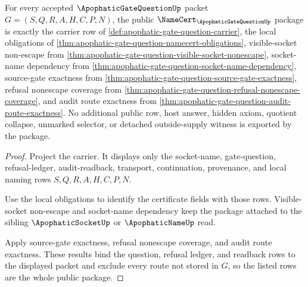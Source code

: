 \begin{theorem}
\label{thm:apophatic-gate-question-public-namecert-package}
For every accepted $\ApophaticGateQuestionUp$ packet $G=(S,Q,R,A,H,C,P,N)$, the public $\NameCert_{\ApophaticGateQuestionUp}$ package is exactly the carrier row of \autoref{def:apophatic-gate-question-carrier}, the local \NameCert{} obligations of \autoref{thm:apophatic-gate-question-namecert-obligations}, visible-socket non-escape from \autoref{thm:apophatic-gate-question-visible-socket-nonescape}, socket-name dependency from \autoref{thm:apophatic-gate-question-socket-name-dependency}, source-gate exactness from \autoref{thm:apophatic-gate-question-source-gate-exactness}, refusal nonescape coverage from \autoref{thm:apophatic-gate-question-refusal-nonescape-coverage}, and audit route exactness from \autoref{thm:apophatic-gate-question-audit-route-exactness}. No additional public row, host answer, hidden axiom, quotient collapse, unmarked selector, or detached outside-supply witness is exported by the package.
\end{theorem}
\begin{proof}
Project the carrier. It displays only the socket-name, gate-question, refusal-ledger, audit-readback, transport, continuation, provenance, and local naming rows $S,Q,R,A,H,C,P,N$.

Use the local \NameCert{} obligations to identify the certificate fields with those rows. Visible-socket non-escape and socket-name dependency keep the package attached to the sibling $\ApophaticSocketUp$ or $\ApophaticNameUp$ read.

Apply source-gate exactness, refusal nonescape coverage, and audit route exactness. These results bind the question, refusal ledger, and readback rows to the displayed packet and exclude every route not stored in $G$, so the listed rows are the whole public package.
\end{proof}



